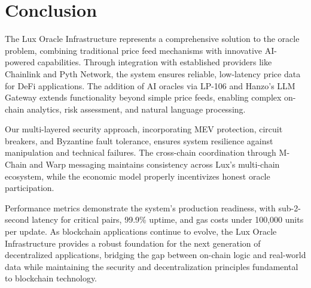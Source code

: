 \section{Conclusion}


The Lux Oracle Infrastructure represents a comprehensive solution to the oracle problem, combining traditional price feed mechanisms with innovative AI-powered capabilities. Through integration with established providers like Chainlink and Pyth Network, the system ensures reliable, low-latency price data for DeFi applications. The addition of AI oracles via LP-106 and Hanzo's LLM Gateway extends functionality beyond simple price feeds, enabling complex on-chain analytics, risk assessment, and natural language processing.

Our multi-layered security approach, incorporating MEV protection, circuit breakers, and Byzantine fault tolerance, ensures system resilience against manipulation and technical failures. The cross-chain coordination through M-Chain and Warp messaging maintains consistency across Lux's multi-chain ecosystem, while the economic model properly incentivizes honest oracle participation.

Performance metrics demonstrate the system's production readiness, with sub-2-second latency for critical pairs, 99.9\% uptime, and gas costs under 100,000 units per update. As blockchain applications continue to evolve, the Lux Oracle Infrastructure provides a robust foundation for the next generation of decentralized applications, bridging the gap between on-chain logic and real-world data while maintaining the security and decentralization principles fundamental to blockchain technology.

